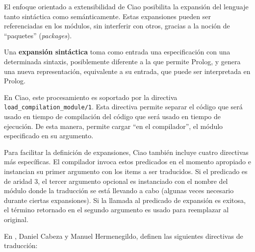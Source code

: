 	El enfoque orientado a extensibilidad de Ciao posibilita 
	la expansi\'on del lenguaje tanto sint\'actica como
        sem\'anticamente. Estas expansiones pueden ser 
	referenciadas en los m\'odulos, sin interferir con otros,
        gracias a la noci\'on de ``paquetes'' (\emph{packages}).
	
	Una {\bf expansi\'on sint\'actica} \cite{gbraun:exp:sint:2000} 
        toma como entrada una especificaci\'on
        con una determinada sintaxis, posiblemente diferente 
	a la que permite Prolog, y genera una nueva representaci\'on, equivalente 
        a su entrada, que puede ser interpretada en Prolog.
	
	En Ciao, este procesamiento es soportado
        por la directiva \texttt{load\_com\-pi\-la\-tion\_mo\-du\-le/1}. 
	Esta directiva permite separar el c\'odigo que ser\'a usado en tiempo de
        compilaci\'on del c\'odigo que ser\'a usado en tiempo de 
	ejecuci\'on. De esta manera, permite cargar ``en el compilador'', el m\'odulo 
        especificado en su argumento.
	
	Para facilitar la definici\'on de expansiones, Ciao tambi\'en incluye
        cuatro directivas m\'as espec\'ificas. 
	El compilador invoca estos
        predicados en el momento apropiado e 
	instancian su primer argumento con los items a ser
        traducidos. Si el predicado es de aridad 3, 
	el tercer argumento opcional es instanciado con el nombre del 
        m\'odulo donde la traducci\'on se est\'a 
	llevando a cabo (algunas veces necesario durante ciertas
        expansiones). Si la llamada al predicado 
	de expansi\'on es exitosa, el t\'ermino retornado en el
        segundo argumento es usado para reemplazar al original. 
	
	En \cite{gbraun:exp:sint:2000}, Daniel Cabeza y Manuel Hermenegildo, definen las
        siguientes directivas de traducci\'on:
	
